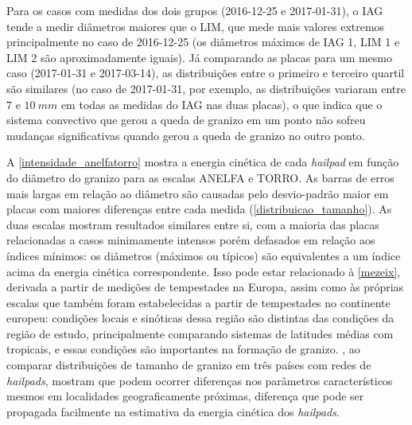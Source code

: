 Para os casos com medidas dos dois grupos (2016-12-25 e 2017-01-31), o IAG tende a medir diâmetros maiores que o LIM, que mede mais valores extremos principalmente no caso de 2016-12-25 (os diâmetros máximos de IAG 1, LIM 1 e LIM 2 são aproximadamente iguais). Já comparando as placas para um mesmo caso (2017-01-31 e 2017-03-14), as distribuições entre o primeiro e terceiro quartil são similares (no caso de 2017-01-31, por exemplo, as distribuições variaram entre $7$ e $10\:mm$ em todas as medidas do IAG nas duas placas), o que indica que o sistema convectivo que gerou a queda de granizo em um ponto não sofreu mudanças significativas quando gerou a queda de granizo no outro ponto. 

A \autoref{intensidade_anelfatorro} mostra a energia cinética de cada \textit{hailpad} em função do diâmetro do granizo para as escalas ANELFA e TORRO. As barras de erros mais largas em relação ao diâmetro são causadas pelo desvio-padrão maior em placas com maiores diferenças entre cada medida (\autoref{distribuicao_tamanho}). As duas escalas mostram resultados similares entre si, com a maioria das placas relacionadas a casos minimamente intensos porém defasados em relação aos índices mínimos: os diâmetros (máximos ou típicos) são equivalentes a um índice acima da energia cinética correspondente. Isso pode estar relacionado à \autoref{mezeix}, derivada a partir de medições de tempestades na Europa, assim como às próprias escalas que também foram estabelecidas a partir de tempestades no continente europeu: condições locais e sinóticas dessa região são distintas das condições da região de estudo, principalmente comparando sistemas de latitudes médias com tropicais, e essas condições são importantes na formação de granizo. , ao comparar distribuições de tamanho de granizo em três países com redes de \textit{hailpads}, mostram que podem ocorrer diferenças nos parâmetros característicos mesmos em localidades geograficamente próximas, diferença que pode ser propagada facilmente na estimativa da energia cinética dos \textit{hailpads}.

